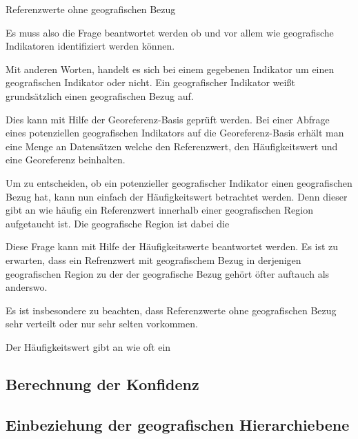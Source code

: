 				Referenzwerte ohne geografischen Bezug





			Es muss also die Frage beantwortet werden ob und vor allem wie geografische Indikatoren identifiziert werden können. 



			Mit anderen Worten, handelt es sich bei einem gegebenen Indikator um einen geografischen Indikator oder nicht.
			Ein geografischer Indikator weißt grundsätzlich einen geografischen Bezug auf. 

			Dies kann mit Hilfe der Georeferenz-Basis geprüft werden.
			Bei einer Abfrage eines potenziellen geografischen Indikators auf die Georeferenz-Basis erhält man eine Menge an Datensätzen welche den Referenzwert, den Häufigkeitswert und eine Georeferenz beinhalten.

			Um zu entscheiden, ob ein potenzieller geografischer Indikator einen geografischen Bezug hat, kann nun einfach der Häufigkeitswert betrachtet werden.
			Denn dieser gibt an wie häufig ein Referenzwert innerhalb einer geografischen Region aufgetaucht ist. 
			Die geografische Region ist dabei die  


			Diese Frage kann mit Hilfe der Häufigkeitswerte beantwortet werden.
			Es ist zu erwarten, dass ein Refrenzwert mit geografischem Bezug in derjenigen geografischen Region zu der der geografische Bezug gehört öfter auftauch als anderswo.


			Es ist insbesondere zu beachten, dass Referenzwerte ohne geografischen Bezug sehr verteilt oder nur sehr selten vorkommen. 


			Der Häufigkeitswert gibt an wie oft ein  



		\subsection{Berechnung der Konfidenz} 

		\subsection{Einbeziehung der geografischen Hierarchiebene} 









